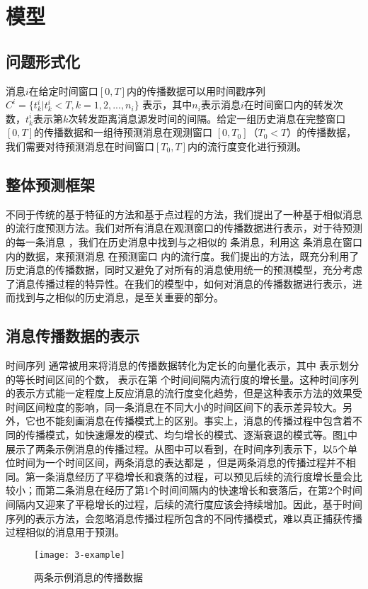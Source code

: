 \section{模型}
\subsection{问题形式化}
消息$i$在给定时间窗口$[0,T]$内的传播数据可以用时间戳序列$C^i=\{t_k^i|t_k^i<T,k=1,2,...,n_i\}$ 表示，其中$n_i$表示消息$i$在时间窗口内的转发次数，$t_k^i$表示第$k$次转发距离消息源发时间的间隔。给定一组历史消息在完整窗口$[0,T]$的传播数据和一组待预测消息在观测窗口 $[0,T_0]$（$T_0<T$）的传播数据，我们需要对待预测消息在时间窗口$[T_0,T]$内的流行度变化进行预测。

\subsection{整体预测框架}
不同于传统的基于特征的方法和基于点过程的方法，我们提出了一种基于相似消息的流行度预测方法。我们对所有消息在观测窗口的传播数据进行表示，对于待预测的每一条消息 ，我们在历史消息中找到与之相似的 条消息，利用这 条消息在窗口 内的数据，来预测消息 在预测窗口 内的流行度。我们提出的方法，既充分利用了历史消息的传播数据，同时又避免了对所有的消息使用统一的预测模型，充分考虑了消息传播过程的特异性。在我们的模型中，如何对消息的传播数据进行表示，进而找到与之相似的历史消息，是至关重要的部分。

\subsection{消息传播数据的表示}
时间序列 通常被用来将消息的传播数据转化为定长的向量化表示，其中 表示划分的等长时间区间的个数， 表示在第 个时间间隔内流行度的增长量。这种时间序列的表示方式能一定程度上反应消息的流行度变化趋势，但是这种表示方法的效果受时间区间粒度的影响，同一条消息在不同大小的时间区间下的表示差异较大。另外，它也不能刻画消息在传播模式上的区别。事实上，消息的传播过程中包含着不同的传播模式，如快速爆发的模式、均匀增长的模式、逐渐衰退的模式等。图\ref{fig:example}中展示了两条示例消息的传播过程。从图中可以看到，在时间序列表示下，以5个单位时间为一个时间区间，两条消息的表达都是 ，但是两条消息的传播过程并不相同。第一条消息经历了平稳增长和衰落的过程，可以预见后续的流行度增长量会比较小；而第二条消息在经历了第1个时间间隔内的快速增长和衰落后，在第2个时间间隔内又迎来了平稳增长的过程，后续的流行度应该会持续增加。因此，基于时间序列的表示方法，会忽略消息传播过程所包含的不同传播模式，难以真正捕获传播过程相似的消息用于预测。
\begin{figure}[!htbp]
  \centering
  \texttt{[image: 3-example]}
  \caption{两条示例消息的传播数据}
  \label{fig:example}
\end{figure}

